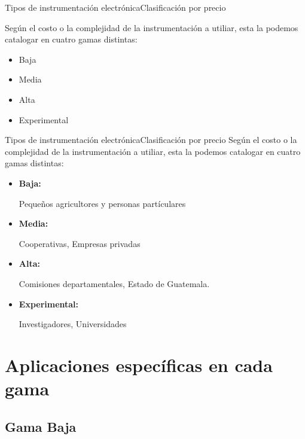 \documentclass[]{beamer}
\begin{document}
\begin{frame}{Tipos de instrumentación electrónica}{Clasificación por precio}

  Según el costo o la complejidad de la instrumentación a utiliar, esta la podemos catalogar en cuatro gamas distintas:
  \begin{itemize}
    \item Baja
    \item Media
    \item Alta
    \item Experimental
  \end{itemize}
\end{frame}

\begin{frame}{Tipos de instrumentación electrónica}{Clasificación por precio}
  Según el costo o la complejidad de la instrumentación a utiliar, esta la podemos catalogar en cuatro gamas distintas:
  \begin{itemize}
    \item \textbf{Baja:}

      Pequeños agricultores y personas partículares
    \item \textbf{Media:}

      Cooperativas, Empresas privadas

    \item \textbf{Alta:}

      Comisiones departamentales, Estado de Guatemala.
    \item \textbf{Experimental:}

      Investigadores, Universidades
  \end{itemize}
\end{frame}

\section{Aplicaciones específicas en cada gama}

\subsection{Gama Baja}
\end{document}
